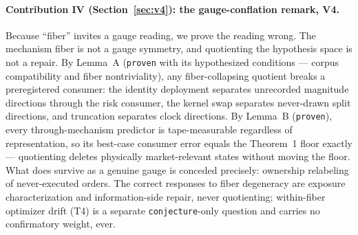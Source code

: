 \paragraph{Contribution IV (Section~\ref{sec:v4}): the gauge-conflation
remark, V4.}
Because ``fiber'' invites a gauge reading, we prove the reading wrong. The
mechanism fiber is not a gauge symmetry, and quotienting the hypothesis
space is not a repair. By Lemma~A (\texttt{proven} with its hypothesized
conditions --- corpus compatibility and fiber nontriviality), any
fiber-collapsing quotient breaks a preregistered consumer: the identity
deployment separates unrecorded magnitude directions through the risk
consumer, the kernel swap separates never-drawn split directions, and
truncation separates clock directions. By Lemma~B (\texttt{proven}), every
through-mechanism predictor is tape-measurable regardless of representation,
so its best-case consumer error equals the Theorem~1 floor exactly ---
quotienting deletes physically market-relevant states without moving the
floor. What does survive as a genuine gauge is conceded precisely: ownership
relabeling of never-executed orders. The correct responses to fiber
degeneracy are exposure characterization and information-side repair, never
quotienting; within-fiber optimizer drift (T4) is a separate
\texttt{conjecture}-only question and carries no confirmatory weight, ever.

